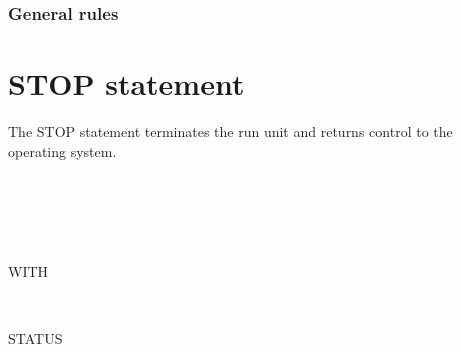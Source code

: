 \subsubsection{General rules}

\section{STOP statement}

The STOP statement terminates the run unit and returns control to the operating system.


\begin{syntax}
   
  \begin{0-1}
    \begin{1=}
       \\
    \end{1=}
    \begin{1=}
      \identifier \\
      \literal
    \end{1=} \\

    WITH
    \begin{1=}
       \\
    \end{1=}
    STATUS
    \begin{0-1}
      \identifier \\
      \literal
    \end{0-1}
  \end{0-1}
\end{syntax}


\begin{syntax}[\deletedcolour]
   \literal
\end{syntax}


\begin{syntax}[\miscextcolour]
   \identifier
\end{syntax}


\begin{syntax}[\miscextcolour]
   
  \begin{1=}
    \identifier \\
    \literal
  \end{1=}
\end{syntax}

